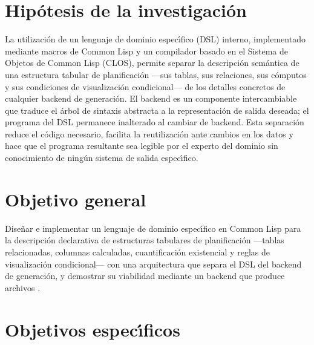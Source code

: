 \section*{Hip\'otesis de la investigaci\'on}

La utilizaci\'on de un lenguaje de dominio espec\'{\i}fico (DSL) interno,
implementado mediante macros de Common Lisp y un compilador basado en el
Sistema de Objetos de Common Lisp (CLOS), permite separar la descripci\'on
sem\'antica de una estructura tabular de planificaci\'on ---sus tablas, sus
relaciones, sus c\'omputos y sus condiciones de visualizaci\'on condicional---
de los detalles concretos de cualquier backend de generaci\'on.  El backend
es un componente intercambiable que traduce el \'arbol de sintaxis abstracta
a la representaci\'on de salida deseada; el programa del DSL permanece
inalterado al cambiar de backend.  Esta separaci\'on reduce el c\'odigo
necesario, facilita la reutilizaci\'on ante cambios en los datos y hace que
el programa resultante sea legible por el experto del dominio sin conocimiento
de ning\'un sistema de salida espec\'{\i}fico.

\section*{Objetivo general}

Dise\~nar e implementar un lenguaje de dominio espec\'{\i}fico en Common Lisp
para la descripci\'on declarativa de estructuras tabulares de planificaci\'on
---tablas relacionadas, columnas calculadas, cuantificaci\'on existencial y
reglas de visualizaci\'on condicional--- con una arquitectura que separa el
DSL del backend de generaci\'on, y demostrar su viabilidad mediante un backend
que produce archivos \xlsx{}.

\section*{Objetivos espec\'{\i}ficos}


